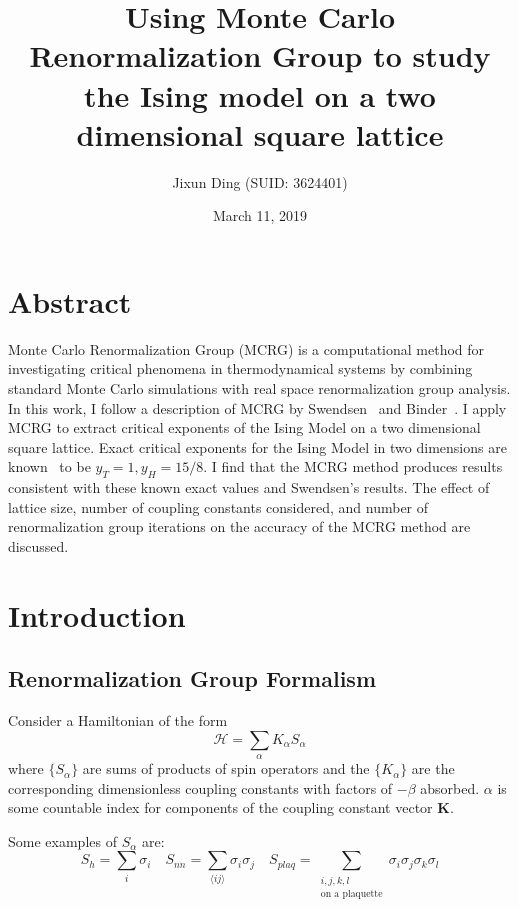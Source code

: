 \documentclass[12pt]{article}
\title{Using Monte Carlo Renormalization Group to study the Ising model on a two dimensional square lattice}
\author{Jixun Ding (SUID: 3624401)}
\date{March 11, 2019}
\renewcommand{\vec}[1]{\mathbf{#1}}
\begin{document}
\maketitle
\section{Abstract}
Monte Carlo Renormalization Group (MCRG) is a computational method for investigating critical phenomena in thermodynamical systems by combining standard Monte Carlo simulations with real space renormalization
group analysis. In this work, I follow a description of MCRG by Swendsen~\cite{SwendsenDetail} and Binder~\cite{Binder2014}. I apply MCRG to extract critical exponents of the Ising Model on a two dimensional square lattice. Exact critical exponents for the Ising Model in two dimensions are known~\cite{Onsager1944} to be $y_T = 1, y_H = 15/8$. I find that the MCRG method produces results consistent with these known exact values and Swendsen's results. The effect of lattice size, number of coupling constants considered, and number of renormalization group iterations on the accuracy of the MCRG method are discussed.
\section{Introduction}
\subsection{Renormalization Group Formalism}
Consider a Hamiltonian of the form
\begin{equation}
\mathcal{H} = \sum_{\alpha} K_\alpha S_\alpha
\end{equation}
where $\{S_\alpha\}$ are sums of products of spin operators and the $\{K_\alpha\}$ are the corresponding dimensionless coupling constants with factors of $-\beta$ absorbed. $\alpha$ is some countable index for components of the coupling constant vector $\vec{K}$. 

Some examples of $S_\alpha$ are:
\begin{equation}
S_{h} = \sum_{i} \sigma_i \quad S_{nn} = \sum_{\langle ij \rangle} \sigma_i\sigma_j \quad S_{plaq} = \sum_{\substack{i,j,k,l\\ \text{on a plaquette}} } \sigma_i\sigma_j\sigma_k\sigma_l
\end{equation}
\end{document}
